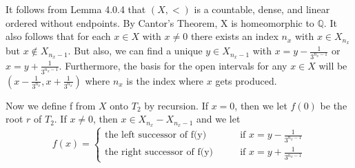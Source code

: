\documentclass[12pt, a4paper]{scrartcl}
\begin{document}
It follows from Lemma 4.0.4 that $(X, <)$ is a countable, dense, and linear ordered without endpoints. By Cantor's Theorem, X is homeomorphic to $\mathbb{Q}$.
It also follows that for each $x \in X$ with $x \neq 0$ there exists an index $n_x$ with $x \in X_{n_x}$ but $x \notin X_{n_{x}-1}$. But also, we can find a unique $y \in X_{{n_x}-1}$ with $x = y - \frac{1}{3^{n_x -1}}$ or $x = y + \frac{1}{3^{n_x -1}}$.
Furthermore, the basis for the open intervals for any $x \in X$ will be $(x- \frac{1}{3^{n_x}}, x + \frac{1}{3^{n_x}})$ where $n_x$ is the index where $x$ gets produced. \newline

Now we define f from $X$ onto $T_2$ by recursion. If $x = 0$, then we let $f(0)$ be the root $r$ of $T_2$. If $x \neq 0$, then 
$x \in X_{n_x} - X_{n_x -1}$ and we let 
\[
            f(x) = 
            \begin{cases}
                \mbox{the left successor of f(y)} \qquad &\mbox{if } x = y - \frac{1}{3^{n_x -1}} \\
                \mbox{the right successor of f(y)} \qquad & \mbox{if } x = y + \frac{1}{3^{n_x -1}}
            \end{cases}
\]
\end{document}
